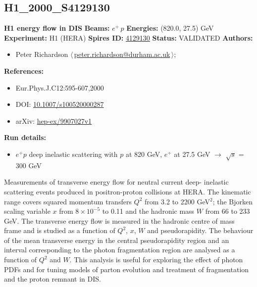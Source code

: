\subsection[H1\_2000\_S4129130]{H1\_2000\_S4129130\,\cite{Adloff:1999ws}}
\textbf{H1 energy flow in DIS}\newline
\textbf{Beams:} $e^+$\,$p$ \newline
\textbf{Energies:} (820.0, 27.5) GeV \newline
\textbf{Experiment:} H1 (HERA) \newline
\textbf{Spires ID:} \href{http://www.slac.stanford.edu/spires/find/hep/www?rawcmd=key+4129130}{4129130}\newline
\textbf{Status:} VALIDATED\newline
\textbf{Authors:}
\begin{itemize}
  \item Peter Richardson $\langle\,$\href{mailto:peter.richardson@durham.ac.uk}{peter.richardson@durham.ac.uk}$\,\rangle$;
\end{itemize}
\textbf{References:}
\begin{itemize}
  \item Eur.Phys.J.C12:595-607,2000
  \item DOI: \href{http://dx.doi.org/10.1007/s100520000287}{10.1007/s100520000287}
  \item arXiv: \href{http://arxiv.org/abs/hep-ex/9907027v1}{hep-ex/9907027v1}
\end{itemize}
\textbf{Run details:}
\begin{itemize}

  \item $e^+ p$ deep inelastic scattering with $p$ at 820 GeV, $e^+$ at 27.5 GeV \ensuremath{\to} \ensuremath{\sqrt{s}} = 300 GeV\end{itemize}

\noindent Measurements of transverse energy flow for neutral current deep- inelastic scattering events produced in positron-proton collisions at HERA. The kinematic range covers squared momentum transfers $Q^2$ from 3.2 to 2200 GeV$^2$; the Bjorken scaling variable $x$ from $8 \times 10^{-5}$ to 0.11 and the hadronic mass $W$ from 66 to 233 GeV. The transverse energy flow is measured in the hadronic centre of mass frame and is studied as a function of $Q^2$, $x$, $W$ and pseudorapidity. The behaviour of the mean transverse energy in the central pseudorapidity region and an interval corresponding to the photon fragmentation region are analysed as a function of $Q^2$ and $W$.  This analysis is useful for exploring the effect of photon PDFs and for tuning models of parton evolution and treatment of fragmentation and the proton remnant in DIS.

